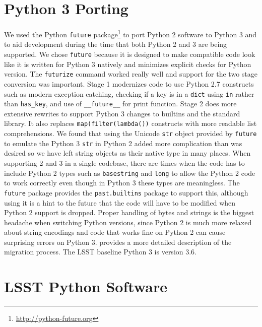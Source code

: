 \documentclass[11pt,twoside]{article}
\begin{document}
\section{Python 3 Porting}

We used the Python \verb|future| package\footnote{\url{http://python-future.org}} to port Python 2 software to Python 3 and to aid development during the time that both Python 2 and 3 are being supported.
We chose \verb|future| because it is designed to make compatible code look like it is written for Python 3 natively and minimizes explicit checks for Python version.
The \verb|futurize| command worked really well and support for the two stage conversion was important.
Stage 1 modernizes code to use Python 2.7 constructs such as modern exception catching, checking if a key is in a \texttt{dict} using \verb|in| rather than \verb|has_key|, and use of \verb|__future__| for print function.
Stage 2 does more extensive rewrites to support Python 3 changes to builtins and the standard library.
It also replaces \verb|map(filter(lambda())| constructs with more readable list comprehensions.
We found that using the Unicode \verb|str| object provided by \verb|future| to emulate the Python 3 \verb|str| in Python 2 added more complication than was desired so we have left string objects as their native type in many places.
When supporting 2 and 3 in a single codebase, there are times when the code has to include Python 2 types such as \texttt{basestring} and \texttt{long} to allow the Python 2 code to work correctly even though in Python 3 these types are meaningless.
The \verb|future| package provides the \texttt{past.builtins} package to support this, although using it is a hint to the future that the code will have to be modified when Python 2 support is dropped.
Proper handling of bytes and strings is the biggest headache when switching Python versions, since Python 2 is much more relaxed about string encodings and code that works fine on Python 2 can cause surprising errors on Python 3.
\citet{SQR-014} provides a more detailed description of the migration process.
The LSST baseline Python 3 is version 3.6.

\section{LSST Python Software}
\end{document}
